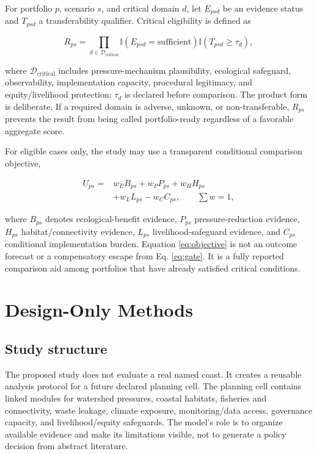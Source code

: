 \documentclass[conference]{IEEEtran}
\begin{document}
For portfolio $p$, scenario $s$, and critical domain $d$, let $E_{psd}$ be an evidence status and $T_{psd}$ a transferability qualifier. Critical eligibility is defined as

\begin{equation}
R_{ps}=\prod_{d\in\mathcal{D}_{\mathrm{critical}}}\mathbb{I}\left(E_{psd}=\mathrm{sufficient}\right)\mathbb{I}\left(T_{psd}\geq\tau_d\right),
\label{eq:gate}
\end{equation}

where $\mathcal{D}_{\mathrm{critical}}$ includes pressure-mechanism plausibility, ecological safeguard, observability, implementation capacity, procedural legitimacy, and equity/livelihood protection; $\tau_d$ is declared before comparison. The product form is deliberate. If a required domain is adverse, unknown, or non-transferable, $R_{ps}$ prevents the result from being called portfolio-ready regardless of a favorable aggregate score.

For eligible cases only, the study may use a transparent conditional comparison objective,

\begin{equation}
\begin{aligned}
U_{ps}={}&w_EB_{ps}+w_PP_{ps}+w_HH_{ps}\\
&+w_LL_{ps}-w_CC_{ps}, \qquad \sum w=1,
\end{aligned}
\label{eq:objective}
\end{equation}

where $B_{ps}$ denotes ecological-benefit evidence, $P_{ps}$ pressure-reduction evidence, $H_{ps}$ habitat/connectivity evidence, $L_{ps}$ livelihood-safeguard evidence, and $C_{ps}$ conditional implementation burden. Equation \eqref{eq:objective} is not an outcome forecast or a compensatory escape from Eq. \eqref{eq:gate}. It is a fully reported comparison aid among portfolios that have already satisfied critical conditions.

\section{Design-Only Methods}

\subsection{Study structure}

The proposed study does not evaluate a real named coast. It creates a reusable analysis protocol for a future declared planning cell. The planning cell contains linked modules for watershed pressures, coastal habitats, fisheries and connectivity, waste leakage, climate exposure, monitoring/data access, governance capacity, and livelihood/equity safeguards. The model's role is to organize available evidence and make its limitations visible, not to generate a policy decision from abstract literature.
\end{document}
